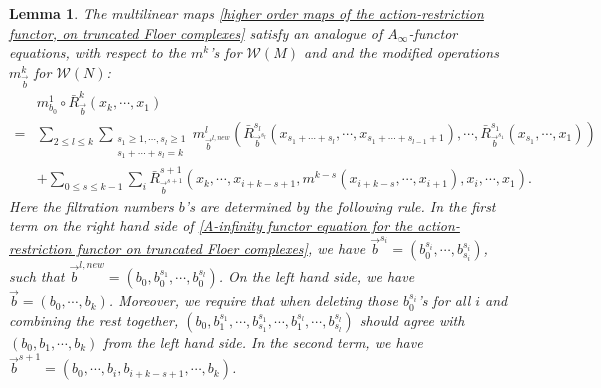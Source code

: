 \documentclass{amsart}
\newtheorem{lemma}[theorem]{Lemma}
\numberwithin{equation}{section}
\numberwithin{figure}{section}
\begin{document}
\begin{lemma}
	The multilinear maps \eqref{higher order maps of the action-restriction functor, on truncated Floer complexes} satisfy an analogue of $A_{\infty}$-functor equations, with respect to the $m^{k}$'s for $\mathcal{W}(M)$ and and the modified operations $m^{k}_{\vec{b}}$ for $\mathcal{W}(N)$:
\begin{equation}\label{A-infinity functor equation for the action-restriction functor on truncated Floer complexes}
\begin{split}
& m^{1}_{b_{0}} \circ \bar{R}^{k}_{\vec{b}}(x_{k}, \cdots, x_{1})\\
= &\sum_{2 \le l \le k} \sum_{\substack{s_{1} \ge 1, \cdots, s_{l} \ge 1\\s_{1} + \cdots + s_{l} = k}}
m^{l}_{\vec{b}^{l, new}}(\bar{R}^{s_{l}}_{\vec{b}^{s_{l}}}(x_{s_{1} + \cdots + s_{l}}, \cdots, x_{s_{1} + \cdots + s_{l-1} + 1}), \cdots, \bar{R}^{s_{1}}_{\vec{b}^{s_{1}}}(x_{s_{1}}, \cdots, x_{1}))\\
&+ \sum_{0 \le s \le k-1} \sum_{i} \bar{R}^{s+1}_{\vec{b}^{s+1}}(x_{k}, \cdots, x_{i+k-s+1}, m^{k-s}(x_{i+k-s}, \cdots, x_{i+1}), x_{i}, \cdots, x_{1}).
\end{split}
\end{equation}
Here the filtration numbers $b$'s are determined by the following rule. In the first term on the right hand side of \eqref{A-infinity functor equation for the action-restriction functor on truncated Floer complexes}, we have $\vec{b}^{s_{i}} = (b^{s_{i}}_{0}, \cdots, b^{s_{i}}_{s_{i}})$, such that $\vec{b}^{l, new} = (b_{0}, b^{s_{1}}_{0}, \cdots, b^{s_{l}}_{0})$. On the left hand side, we have $\vec{b} = (b_{0}, \cdots, b_{k})$. 
Moreover, we require that when deleting those $b^{s_{i}}_{0}$'s for all $i$ and combining the rest together, $(b_{0}, b^{s_{1}}_{1}, \cdots, b^{s_{1}}_{s_{1}}, \cdots, b^{s_{l}}_{1}, \cdots, b^{s_{l}}_{s_{l}})$ should agree with $(b_{0}, b_{1}, \cdots, b_{k})$ from the left hand side.
In the second term, we have $\vec{b}^{s+1} = (b_{0}, \cdots, b_{i}, b_{i+k-s+1}, \cdots, b_{k})$.
\end{lemma}
\end{document}
